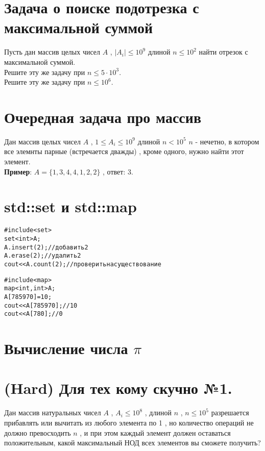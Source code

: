 \documentclass[10pt]{article}
\begin{document}
    \section{Задача о поиске подотрезка с максимальной суммой}
    Пусть дан массив целых чисел $A$ , $|A_i| \leq 10^9$  длиной $n \leq 10^2$ найти отрезок с максимальной суммой.
    \\
    Решите эту же задачу при $n \leq 5\cdot 10^3$.
    \\
    Решите эту же задачу при $n \leq 10^6$.
    \section{Очередная задача про массив}
    Дан массив целых чисел $A$ , $ 1\leq A_i \leq 10^9$ длиной $n < 10^5$ $n$ - нечетно, в котором все элемнты парные (встречается дважды) , кроме одного, нужно найти этот элемент.
    \\
    \textbf{Пример}: $A = \{1 , 3 , 4 , 4 , 1 , 2 , 2\}$ , ответ: 3.
    \section{std::set и std::map}
    \begin{alltt}
#include<set>
set<int> A;
A.insert(2); // добавить 2
A.erase(2); // удалить 2
cout << A.count(2); // проверить на существование 
    \end{alltt}
\begin{alltt}
#include<map>
map<int, int> A;
A[785970] = 10;
cout << A[785970]; // 10
cout << A[780]; // 0
    \end{alltt}
    \section{Вычисление числа \huge $\pi$ \normalsize}
    \section{(Hard) Для тех кому скучно №1.} 
    Дан массив натуральных чисел $A$ , $A_i \leq 10^8$ , длиной $n$ , $n \leq 10^5$ разрешается прибавлять или вычитать из любого
    элемента по 1 , но количество операций не должно превосходить $n$ , и при этом каждый элемент должен оставаться положительным, какой максимальный НОД всех элементов вы сможете
    получить?
    \\
    \\
    \\
    
\end{document}
